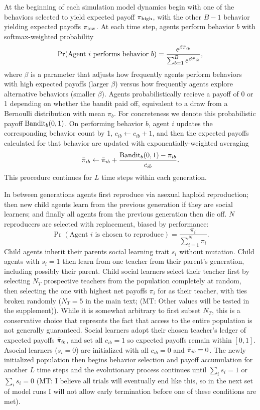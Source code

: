 \documentclass[letterpaper,11.5pt]{scrartcl}
\newcommand{\mt}[1]{{\textcolor{myorange} {({\tiny MT:} #1)}}}
\begin{document}
At the beginning of each simulation model dynamics begin with 
one of the behaviors selected to 
yield expected payoff $\pi_{\mathrm{high}}$, with the other $B-1$ behavior yielding
expected payoffs $\pi_{\mathrm{low}}$. At each time step, agents perform behavior $b$ 
with softmax-weighted probability
\begin{equation}
  \Pr(\text{Agent $i$ performs behavior $b$}) = 
    \frac{e^{\beta \bar\pi_{ib}}}{\sum_{b=1}^B e^{\beta \bar\pi_{ib}}},
\end{equation}
\noindent
where $\beta$ is a parameter that adjusts how frequently agents perform 
behaviors with high expected payoffs (larger $\beta$) versus how frequently
agents explore alternative behaviors (smaller $\beta$). 
Agents probabilistically recieve a payoff of 0 or 1 depending on whether the
bandit paid off, equivalent to a draw from a Bernoulli distribution with 
mean $\pi_b$. For concreteness we denote this probabilistic payoff
$\text{Bandit}_b(0, 1)$. On performing behavior $b$, agent $i$ updates the
corresponding behavior count by 1, $c_{ib} \leftarrow c_{ib} + 1$, and then
the expected payoffs calculated for that behavior are updated with
exponentially-weighted averaging
\begin{equation}
  \bar\pi_{ib} \leftarrow \bar\pi_{ib} + \frac{\text{Bandit}_b(0, 1) - \bar\pi_{ib}}{c_{ib}}.
\end{equation}
\noindent
This procedure continues for $L$ time steps within each generation.

In between generations agents first reproduce via asexual haploid reproduction; 
then new child agents learn from the
previous generation if they are social learners; and finally all agents from the
previous generation then die off. $N$ reproducers are selected with replacement, 
biased by performance:
\begin{equation}
  \Pr(\text{Agent $i$ is chosen to reproduce}) = \frac{\pi_i}{\sum_{i=1}^N \pi_i}.
\end{equation}
\noindent
Child agents inherit their parents social learning trait $s_i$ without mutation.
Child agents with $s_i = 1$ then learn from one teacher from their parent's
generation, including possibly their parent. Child social learners select
their teacher first by selecting $N_T$ prospective teachers from the 
population completely at random, then selecting the one with highest
net payoffs $\pi_i$ for as their teacher, with ties broken randomly 
($N_T = 5$ in the main text;
\mt{Other values will be tested in the supplement}). While it is somewhat
arbitrary to first subset $N_T$, this is a conservative choice that
represnts the fact that access to the entire population is not generally
guaranteed. Social learners adopt their chosen teacher's ledger of 
expected payoffs $\bar\pi_{ib}$, and set
all $c_{ib} = 1$ so expected payoffs remain within $[0, 1]$. 
Asocial learners ($s_i = 0$) are initialized with all $c_{ib} = 0$ and
$\bar\pi_{ib} = 0$. The newly initialized population then begins behavior selection
and payoff accumulation for another $L$ time steps and the evolutionary process
continues until $\sum_i s_i = 1$ or $\sum_i s_i = 0$ \mt{I believe
all trials will eventually end like this, so in the next set of model runs I will
not allow early termination before one of these conditions are met}.
\end{document}

